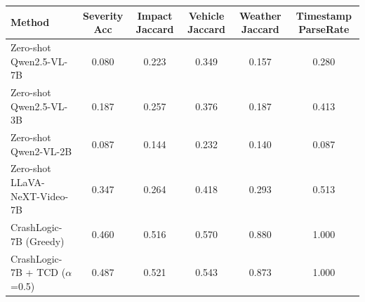 \begin{tabular}{lccccc}
\toprule
Method & Severity Acc & Impact Jaccard & Vehicle Jaccard & Weather Jaccard & Timestamp ParseRate \\
\midrule
Zero-shot Qwen2.5-VL-7B & 0.080 & 0.223 & 0.349 & 0.157 & 0.280 \\
Zero-shot Qwen2.5-VL-3B & 0.187 & 0.257 & 0.376 & 0.187 & 0.413 \\
Zero-shot Qwen2-VL-2B & 0.087 & 0.144 & 0.232 & 0.140 & 0.087 \\
Zero-shot LLaVA-NeXT-Video-7B & 0.347 & 0.264 & 0.418 & 0.293 & 0.513 \\
CrashLogic-7B (Greedy) & 0.460 & 0.516 & 0.570 & 0.880 & 1.000 \\
CrashLogic-7B + TCD ($\alpha$=0.5) & 0.487 & 0.521 & 0.543 & 0.873 & 1.000 \\
\bottomrule
\end{tabular}
